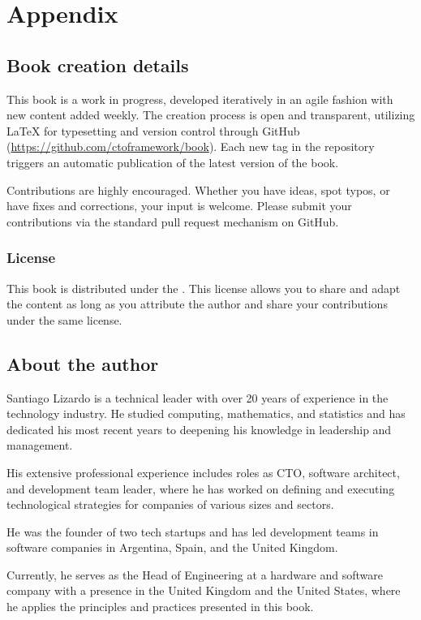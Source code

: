 \appendix

\chapter{Appendix}

\section*{Book creation details}

This book is a work in progress, developed iteratively in an agile fashion with new content added weekly. The creation process is open and transparent, utilizing \LaTeX{} for typesetting and version control through GitHub (\url{https://github.com/ctoframework/book}). Each new tag in the repository triggers an automatic publication of the latest version of the book.

Contributions are highly encouraged. Whether you have ideas, spot typos, or have fixes and corrections, your input is welcome. Please submit your contributions via the standard pull request mechanism on GitHub.

\subsection*{License}

This book is distributed under the \booklicence. This license allows you to share and adapt the content as long as you attribute the author and share your contributions under the same license.

\section*{About the author}

Santiago Lizardo is a technical leader with over 20 years of experience in the technology industry. He studied computing, mathematics, and statistics and has dedicated his most recent years to deepening his knowledge in leadership and management.

His extensive professional experience includes roles as CTO, software architect, and development team leader, where he has worked on defining and executing technological strategies for companies of various sizes and sectors.

He was the founder of two tech startups and has led development teams in software companies in Argentina, Spain, and the United Kingdom.

Currently, he serves as the Head of Engineering at a hardware and software company with a presence in the United Kingdom and the United States, where he applies the principles and practices presented in this book.
